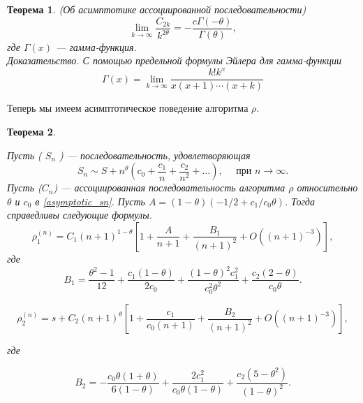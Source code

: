 \documentclass[14pt, a4paper]{extarticle}
\newtheorem{theorem}{Теорема}[section] %
\theoremstyle{definition}
\theoremstyle{remark}
\begin{document}
\begin{theorem}(Об асимптотике ассоциированной последовательности)
\begin{equation*}
\lim _{k \rightarrow \infty} \frac{C_{2 k}}{k^{2 \theta}}=-\frac{c \Gamma(-\theta)} {\Gamma(\theta)},
\end{equation*}
где $\Gamma(x)$ — гамма-функция.\\
Доказательство. С помощью предельной формулы Эйлера для гамма-функции
\begin{equation*}
\Gamma(x)=\lim _{k \rightarrow \infty} \frac{k!k^{x}}{x(x+1) \cdots(x+k)}
\end{equation*}
\end{theorem}
Теперь мы имеем асимптотическое поведение алгоритма $\rho$.\\
\begin{theorem} \label{rho and cn formula}
    
Пусть ( $S_{n}$ ) — последовательность, удовлетворяющая
\begin{equation} \label{asymptotic_sn}
S_{n} \sim S+n^{\theta}\left(c_{0}+\frac{c_{1}}{n}+\frac{c_{2}}{n^{2}}+\ldots\right), \quad \text { при } n \rightarrow \infty .
\end{equation}
Пусть ($C_{n}$) — ассоциированная последовательность алгоритма $\rho$ относительно $\theta$ и $c_{0}$ в \eqref{asymptotic_sn}. Пусть $A=(1-\theta)\left(-1 / 2+c_{1} / c_{0} \theta\right)$. Тогда справедливы следующие формулы.\\

\begin{equation} \label{rho1n}
\rho_{1}^{(n)}=C_{1}(n+1)^{1-\theta}\left[1+\frac{A}{n+1}+\frac{B_{1}}{(n+1)^{2}}+O\left((n+1)^{-3}\right)\right],
\end{equation}
где
\begin{equation*} 
B_{1}=\frac{\theta^{2}-1}{12}+\frac{c_{1}(1-\theta)}{2 c_{0}}+\frac{(1-\theta)^{2} c_{1}^{2}}{c_{0}^ {2} \theta^{2}}+\frac{c_{2}(2-\theta)}{c_{0} \theta} .
\end{equation*}


\begin{equation} \label{rho2n}
\rho_{2}^{(n)}=s+C_{2}(n+1)^{\theta}\left[1+\frac{c_{1}}{c_{0}(n+1)}+\frac{B_{2}}{(n+1)^{2}}+O\left((n+1)^{-3}\right)\right],
\end{equation}

где

\begin{equation*}
B_{2}=-\frac{c_{0} \theta(1+\theta)}{6(1-\theta)}+\frac{2 c_{1}^{2}}{c_{0} \theta(1-\theta)}+\frac{c_{2}\left(5-\theta^{2}\right)}{(1-\theta)^{2}} .
\end{equation*}


\end{theorem}
\end{document}
